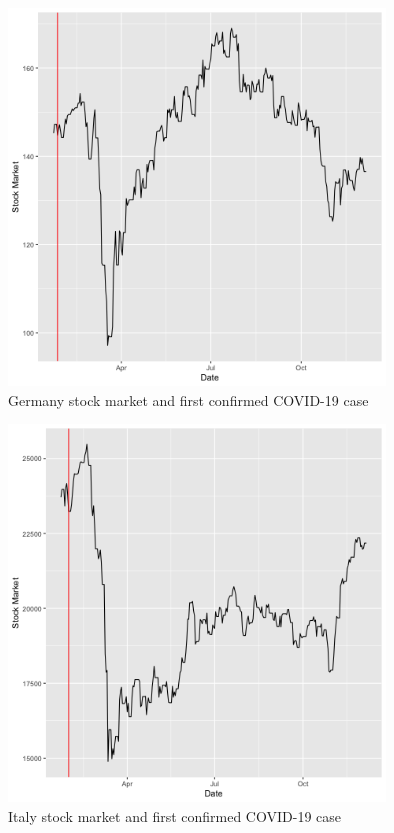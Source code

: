 \documentclass[11pt]{article}
\begin{document}
\begin{figure}[!h]
\centering
  \includegraphics[width=100mm]{R-Code/plots/germanyFinance.png}   
  \caption{Germany stock market and first confirmed COVID-19 case}
  \label{germany-covid-market}
\end{figure}

\begin{figure}[!h]
\centering
  \includegraphics[width=100mm]{R-Code/plots/italyFinance.png}  
  \caption{Italy stock market and first confirmed COVID-19 case}
  \label{italy-covid-market}
\end{figure}
\end{document}
